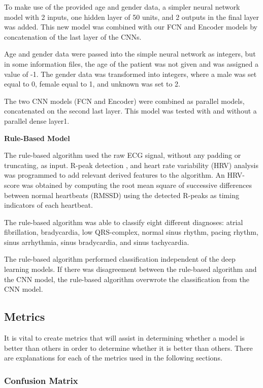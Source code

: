 To make use of the provided age and gender data, a simpler neural network model with 2 inputs, one hidden layer of 50 units, and 2 outputs in the final layer was added. This new model was combined with our FCN and Encoder models by concatenation of the last layer of the CNNs.

Age and gender data were passed into the simple neural network as integers, but in some information files, the age of the patient was not given and was assigned a value of -1. The gender data was transformed into integers, where a male was set equal to 0, female equal to 1, and unknown was set to 2.

The two CNN models (FCN and Encoder) were combined as parallel models, concatenated on the second last layer. This model was tested with and without a parallel dense layer1.

\textbf{Rule-Based Model}

The rule-based algorithm used the raw ECG signal, without any padding or truncating, as input. R-peak detection \cite{4122029}, and heart rate variability (HRV) analysis was programmed to add relevant derived features to the algorithm. An HRV-score was obtained by computing the root mean square of successive differences between normal heartbeats (RMSSD) using the detected R-peaks as timing indicators of each heartbeat.

The rule-based algorithm was able to classify eight different diagnoses: atrial fibrillation, bradycardia, low QRS-complex, normal sinus rhythm, pacing rhythm, sinus arrhythmia, sinus bradycardia, and sinus tachycardia.

The rule-based algorithm performed classification independent of the deep learning models. If there was disagreement between the rule-based algorithm and the CNN model, the rule-based algorithm overwrote the classification from the CNN model.


\subsection{Metrics} \label{3metrics}

It is vital to create metrics that will assist in determining whether a model is better than others in order to determine whether it is better than others. There are explanations for each of the metrics used in the following sections.


\subsubsection{Confusion Matrix} \label{4confmatrix}

